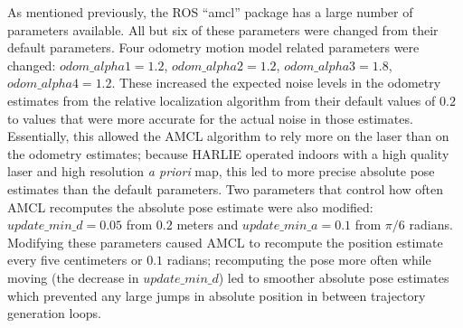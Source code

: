 As mentioned previously, the ROS ``amcl'' package has a large number of parameters available. All but six of these parameters were changed from their default parameters. Four odometry motion model related parameters were changed: $odom\_alpha1 = 1.2$, $odom\_alpha2 = 1.2$, $odom\_alpha3 = 1.8$, $odom\_alpha4 = 1.2$. These increased the expected noise levels in the odometry estimates from the relative localization algorithm from their default values of $0.2$ to values that were more accurate for the actual noise in those estimates. Essentially, this allowed the AMCL algorithm to rely more on the laser than on the odometry estimates; because HARLIE operated indoors with a high quality laser and high resolution \emph{a priori} map, this led to more precise absolute pose estimates than the default parameters. Two parameters that control how often AMCL recomputes the absolute pose estimate were also modified: $update\_min\_d = 0.05$ from $0.2$ meters and $update\_min\_a = 0.1$ from $\pi/6 $ radians. Modifying these parameters caused AMCL to recompute the position estimate every five centimeters or $0.1$ radians; recomputing the pose more often while moving (the decrease in $update\_min\_d$) led to smoother absolute pose estimates which prevented any large jumps in absolute position in between trajectory generation loops.

\begin{comment}
This section details the PSO used on HARLIE and has data and figures and shit for how accurate it is

Outline:
	Why do we need localization? Why do we need PRECISE localization?

	Parts
		Relative Localization
			EKF on HARLIE
		Absolute Localization
			AMCL algorithm
			Needs tuned to prevent pops
		Results

\end{comment}

